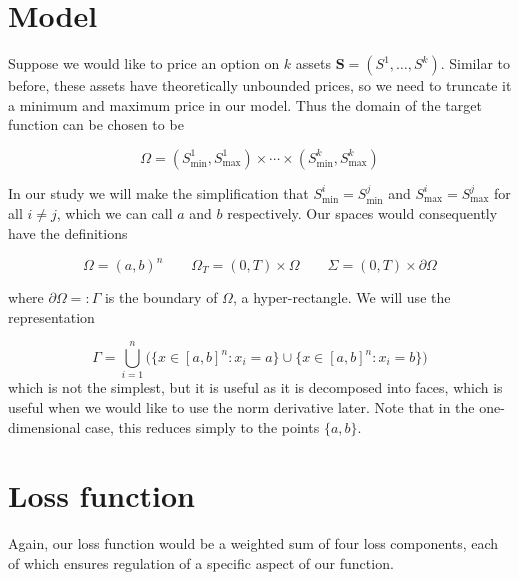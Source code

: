 \section{Model}
Suppose we would like to price an option on $k$ assets $\bm S = (S^1, \dots, S^k)$. Similar to before, these assets have theoretically unbounded prices, so we need to truncate it a minimum and maximum price in our model. Thus the domain of the target function can be chosen to be

\[\Omega = (S_\text{min}^1, S_\text{max}^1) \times \cdots \times (S_\text{min}^k, S_\text{max}^k)\]

In our study we will make the simplification that $S_\text{min}^i = S_\text{min}^j$ and $S_\text{max}^i = S_\text{max}^j$ for all $i \ne j$, which we can call $a$ and $b$ respectively. Our spaces would consequently have the definitions

\[\Omega = (a, b)^n \qquad \Omega_T = (0, T) \times \Omega \qquad \Sigma = (0, T) \times \partial \Omega\]

where $\partial \Omega =: \Gamma$ is the boundary of $\Omega$, a hyper-rectangle. We will use the representation

\[\Gamma = \bigcup_{i=1}^n \big(\{x \in [a, b]^n : x_i = a\} \cup \{x \in [a, b]^n : x_i = b\} \big)\]
which is not the simplest, but it is useful as it is decomposed into faces, which is useful when we would like to use the norm derivative later. Note that in the one-dimensional case, this reduces simply to the points $\{a, b\}$.

\section{Loss function}
Again, our loss function would be a weighted sum of four loss components, each of which ensures regulation of a specific aspect of our function.

